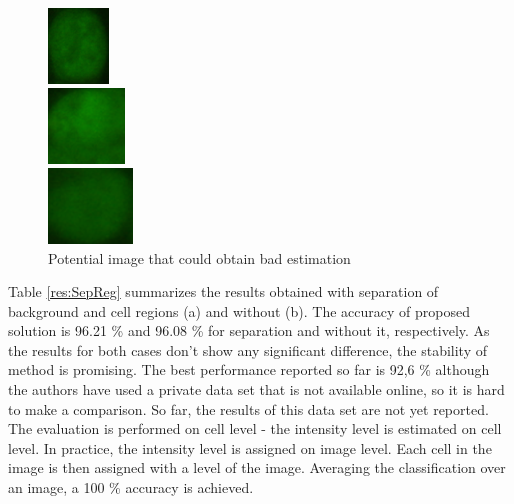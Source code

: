 \begin{figure}
	\begin{minipage}[h]{0.32\linewidth}
		\begin{flushright}
			\includegraphics[height=2cm]{Figures/intensity/image1}
		\end{flushright}
	\end{minipage}
	\begin{minipage}[h]{0.32\linewidth}
		\centering
		\includegraphics[height=2cm]{Figures/intensity/image2}
	\end{minipage}
	\begin{minipage}[h]{0.32\linewidth}
		\begin{flushleft}
			\includegraphics[height=2cm]{Figures/intensity/image3}
		\end{flushleft}
	\end{minipage}
	\caption{Potential image that could obtain bad estimation}
	\label{fig:Bad}
\end{figure}

Table \ref{res:SepReg} summarizes the results obtained with separation of background and cell regions (a) and without (b). The accuracy of proposed solution is 96.21 \% and 96.08 \% for separation and without it, respectively. As the results for both cases don't show any significant difference, the stability of method is promising.  The best performance reported so far is 92,6 \% although the authors have used a private data set that is not available online, so it is hard to make a comparison.  So far, the results of this data set are not yet reported. \\

The evaluation is performed on cell level - the intensity level is estimated on cell level. In practice, the intensity level is assigned on image level. Each cell in the image is then assigned with a level of the image. Averaging the classification over an image, a 100 \% accuracy is achieved.




